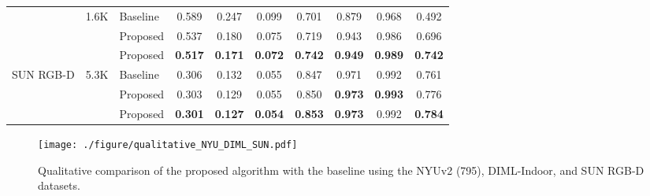\documentclass[runningheads]{llncs}
\begin{document}
\begin{table}[!t]
\begin{tabular}{c@{\hskip 0.9em}c@{\hskip 0.9em}c@{\hskip 0.9em}c@{\hskip 0.9em}c@{\hskip 0.9em}c@{\hskip 0.9em}c@{\hskip 0.9em}|ccccccc}
    & \multicolumn{4}{c}{\multirow{3}{*}{1.6K}} & \multicolumn{2}{|l|}{Baseline} & 0.589 & 0.247 & 0.099 & 0.701 & 0.879 & 0.968 & 0.492\\
    & \multicolumn{4}{c}{} & \multicolumn{2}{|l|}{Proposed} & 0.537 & 0.180 & 0.075 & 0.719 & 0.943 & 0.986 & 0.696\\
    & \multicolumn{4}{c}{} & \multicolumn{2}{|l|}{Proposed} & \textbf{0.517} & \textbf{0.171} & \textbf{0.072} & \textbf{0.742} & \textbf{0.949} & \textbf{0.989} & \textbf{0.742}\\
    \midrule
    \multicolumn{1}{c}{\multirow{3}{*}{SUN RGB-D}}
    & \multicolumn{4}{c}{\multirow{3}{*}{5.3K}} & \multicolumn{2}{|l|}{Baseline} & 0.306 & 0.132 & 0.055 & 0.847 & 0.971 & 0.992 & 0.761\\
    & \multicolumn{4}{c}{} & \multicolumn{2}{|l|}{Proposed} & 0.303 & 0.129 & 0.055 & 0.850 & \textbf{0.973} & \textbf{0.993} & 0.776\\
    & \multicolumn{4}{c}{} & \multicolumn{2}{|l|}{Proposed} & \textbf{0.301} & \textbf{0.127} & \textbf{0.054} & \textbf{0.853} & \textbf{0.973} & 0.992 & \textbf{0.784}\\
    \bottomrule
    \end{tabular}
    \label{tb:dataset_size_nyu}
\end{table}

\begin{figure}[!t]
  \centering
   \texttt{[image: ./figure/qualitative\_NYU\_DIML\_SUN.pdf]}
   \caption{Qualitative comparison of the proposed algorithm with the baseline using the NYUv2 (795), DIML-Indoor, and SUN RGB-D datasets.}
   \label{fig:qualitative_795}
\end{figure}
\end{document}

